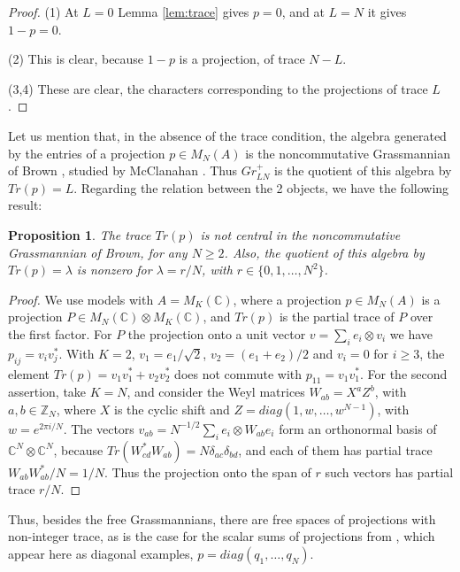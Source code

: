 \documentclass[11pt]{article}
\theoremstyle{plain}
\newtheorem{proposition}[theorem]{Proposition}
\begin{document}
\begin{proof}
(1) At $L=0$ Lemma \ref{lem:trace} gives $p=0$, and at $L=N$ it gives $1-p=0$.

(2) This is clear, because $1-p$ is a projection, of trace $N-L$.

(3,4) These are clear, the characters corresponding to the projections of trace $L$.
\end{proof}

Let us mention that, in the absence of the trace condition, the algebra generated by the entries of a projection $p\in M_N(A)$ is the noncommutative Grassmannian of Brown \cite{bro}, studied by McClanahan \cite{mcc}. Thus $Gr^+_{LN}$ is the quotient of this algebra by $Tr(p)=L$. Regarding the relation between the 2 objects, we have the following result:

\begin{proposition}
\label{prop:brown}
The trace $Tr(p)$ is not central in the noncommutative Grassmannian of Brown, for any $N\geq2$. Also, the quotient of this algebra by $Tr(p)=\lambda$ is nonzero for $\lambda=r/N$, with $r\in\{0,1,\ldots,N^2\}$.
\end{proposition}

\begin{proof}
We use models with $A=M_K(\mathbb C)$, where a projection $p\in M_N(A)$ is a projection $P\in M_N(\mathbb C)\otimes M_K(\mathbb C)$, and $Tr(p)$ is the partial trace of $P$ over the first factor. For $P$ the projection onto a unit vector $v=\sum_ie_i\otimes v_i$ we have $p_{ij}=v_iv_j^*$. With $K=2$, $v_1=e_1/\sqrt{2}$, $v_2=(e_1+e_2)/2$ and $v_i=0$ for $i\geq3$, the element $Tr(p)=v_1v_1^*+v_2v_2^*$ does not commute with $p_{11}=v_1v_1^*$. For the second assertion, take $K=N$, and consider the Weyl matrices $W_{ab}=X^aZ^b$, with $a,b\in\mathbb Z_N$, where $X$ is the cyclic shift and $Z=diag(1,w,\ldots,w^{N-1})$, with $w=e^{2\pi i/N}$. The vectors $v_{ab}=N^{-1/2}\sum_ie_i\otimes W_{ab}e_i$ form an orthonormal basis of $\mathbb C^N\otimes\mathbb C^N$, because $Tr(W_{cd}^*W_{ab})=N\delta_{ac}\delta_{bd}$, and each of them has partial trace $W_{ab}W_{ab}^*/N=1/N$. Thus the projection onto the span of $r$ such vectors has partial trace $r/N$.
\end{proof}

Thus, besides the free Grassmannians, there are free spaces of projections with non-integer trace, as is the case for the scalar sums of projections from \cite{krs}, which appear here as diagonal examples, $p=diag(q_1,\ldots,q_N)$.
\end{document}
